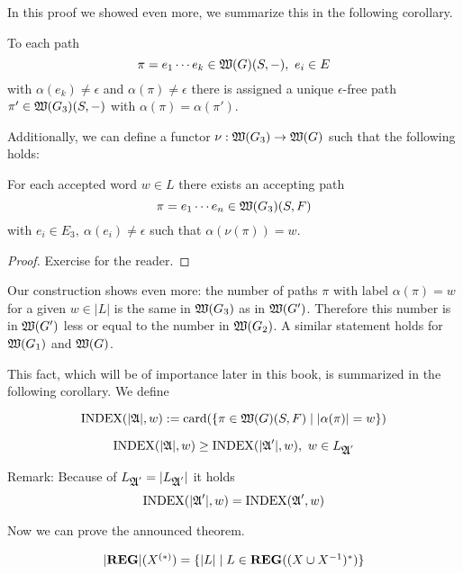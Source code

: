 \bigskip
In this proof we showed even more, we summarize this in the following corollary.

\begin{corollary}
To each path
\[ \pi = e_1 \cdots e_k \in \mbox{$\mathfrak{W}({G})$}(S, -),\ e_i \in E \]
with $\alpha(e_k) \neq \epsilon$ and $\alpha(\pi) \neq \epsilon$ there is
assigned a unique $\epsilon$-free path $\pi' \in \mbox{$\mathfrak{W}({G_3})$}(S, -)$ with $\alpha(\pi) =
\alpha(\pi')$.

Additionally, we can define a functor $\nu : \mbox{$\mathfrak{W}({G_3})$} \to \mbox{$\mathfrak{W}({G})$}$ such
that the following holds:

For each accepted word $w \in L$ there exists an accepting path
\[ \pi = e_1 \cdots e_n \in \mbox{$\mathfrak{W}({G_3})$}(S, F) \]
with $e_i \in E_3,\ \alpha(e_i) \neq \epsilon$ such that $\alpha(\nu(\pi)) = w$.
\end{corollary}

\begin{proof}
Exercise for the reader.
\end{proof}

Our construction shows even more: the number of paths $\pi$ with label
$\alpha(\pi) = w$ for a given $w \in |L|$ is the same in $\mbox{$\mathfrak{W}({G_3})$}$ as in
$\mbox{$\mathfrak{W}({G'})$}$. Therefore this number is in $\mbox{$\mathfrak{W}({G'})$}$ less or equal to
the number in $\mbox{$\mathfrak{W}({G_2})$}$. A similar statement holds for $\mbox{$\mathfrak{W}({G_1})$}$ and
$\mbox{$\mathfrak{W}({G})$}$.

This fact, which will be of importance later in this book, is summarized in the
following corollary. We define

\begin{definition}
\[ \mathrm{INDEX}(|\mbox{$\mathfrak{A}$}|, w) := \mathrm{card}({\mbox{$\{\pi \in \mbox{$\mathfrak{W}({G})$}(S, F) \mid
|\alpha(\pi)| = w\}$}}) \]
\end{definition}

\bigskip
\begin{corollary}
\[ \mathrm{INDEX}(|\mbox{$\mathfrak{A}$}|, w) \geq \mathrm{INDEX}(|\mbox{$\mathfrak{A}$}'|, w),\ w \in
L_{\mbox{$\mathfrak{A}$}'} \]
\end{corollary}

Remark: Because of $L_{\mbox{$\mathfrak{A}$}'} = |L_{\mbox{$\mathfrak{A}$}'}|$ it holds
\[ \mathrm{INDEX}(|\mbox{$\mathfrak{A}$}'|, w) = \mathrm{INDEX}(\mbox{$\mathfrak{A}$}', w) \]

Now we can prove the announced theorem.

\bigskip
\begin{theorem}
\[ |\mbox{{\bf REG}}|(\mbox{${X}^{(*)}$}) = \mbox{$\{|L| \mid L \in \mbox{{\bf REG}}((X\cup X^{-1})^*)\}$} \]
\end{theorem}

